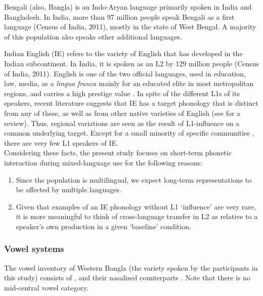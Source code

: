 \documentclass[charis,linguex]{glossa}
\newcommand{\nt}[1]{\textipa{[#1]}} %
\begin{document}
Bengali (also, Bangla) is an Indo-Aryan language primarily spoken in India and Bangladesh. In India, more than 97 million people speak Bengali as a first language (Census of India, 2011), mostly in the state of West Bengal. A majority of this population also speaks other additional languages.

Indian English (IE) refers to the variety of English that has developed in the Indian subcontinent. In India, it is spoken as an L2 by 129 million people (Census of India, 2011).  English is one of the two official languages, used in education, law, media, as a \emph{lingua franca} mainly for an educated elite in most metropolitan regions, and carries a high prestige value \citep{tollefson2014language}.
In spite of the different L1s of its speakers, recent literature suggests that IE has a target phonology that is distinct from any of these, as well as from other native varieties of English (see \cite{sirsa2013effects} for a review). Thus, regional variations are seen as the result of L1-influence on a common underlying target. 
Except for a small minority of specific communities \citep{pandey201517}, there are very few L1 speakers of IE.\\


Considering these facts, the present study focuses on short-term phonetic interaction during mixed-language use for the following reasons:
\begin{enumerate}[label=(\roman*)]
	\item Since the population is multilingual, we expect long-term representations to be affected by multiple languages. 
	\item Given that examples of an IE phonology without L1 `influence' are very rare, it is more meaningful to think of cross-language transfer in L2 as relative to a speaker's own production in a given `baseline' condition.
\end{enumerate}


\subsubsection{Vowel systems} \label{vowel systems}
The vowel inventory of Western Bangla (the variety spoken by the participants in this study) consists of \nt{i, e, \ae, a, O, o, u}, and their nasalized counterparts \citep{garry2001facts}. Note that there is no mid-central vowel category. 
\end{document}

